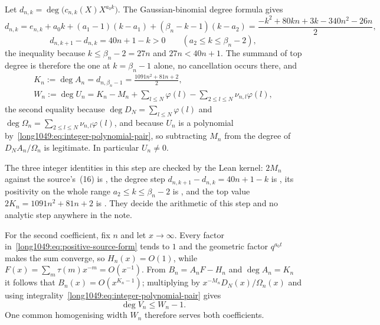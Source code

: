 Let $d_{n,k}=\deg\bigl(c_{n,k}(X)X^{a_0k}\bigr)$.  The Gaussian-binomial degree
formula gives
\[
 d_{n,k}=e_{n,k}+a_0k+(a_1-1)(k-a_1)+(\beta_n-k-1)(k-a_2)
 =\frac{-k^{2}+80kn+3k-340n^{2}-26n}{2},
\]
\[
 d_{n,k+1}-d_{n,k}=40n+1-k>0\qquad(a_2\le k\le\beta_n-2),
\]
the inequality because $k\le\beta_n-2=27n$ and $27n<40n+1$.  The summand of
top degree is therefore the one at $k=\beta_n-1$ alone, no cancellation occurs
there, and
\begin{equation}\label{long1049:eq:exact-degree}
 \begin{gathered}
 K_n:=\deg A_n=d_{n,\beta_n-1}=\frac{1091n^{2}+81n+2}{2},
 \\
 W_n:=\deg U_n=K_n-M_n+\sum_{l\le N}\varphi(l)-\sum_{2\le l\le N}\nu_{n,l}\varphi(l),
\end{gathered}
\end{equation}
the second equality because $\deg D_N=\sum_{l\le N}\varphi(l)$ and
$\deg\Omega_n=\sum_{2\le l\le N}\nu_{n,l}\varphi(l)$, and because
$U_n$ is a polynomial by~\eqref{long1049:eq:integer-polynomial-pair}, so subtracting
$M_n$ from the degree of $D_NA_n/\Omega_n$ is legitimate.  In particular
$U_n\ne0$.

The three integer identities in this step are checked by the Lean kernel:
$2M_n$ against the source's~(16) is
, the degree step $d_{n,k+1}-d_{n,k}=40n+1-k$ is
, its positivity on the whole range $a_2\le k\le\beta_n-2$ is
, and the top value $2K_n=1091n^{2}+81n+2$ is
.  They decide the arithmetic of this step and no analytic step
anywhere in the note.

For the second coefficient, fix $n$ and let $x\to\infty$.  Every factor
in~\eqref{long1049:eq:positive-source-form} tends to $1$ and the geometric factor
$q^{a_0t}$ makes the sum converge, so $H_n(x)=O(1)$, while
$F(x)=\sum_m\tau(m)x^{-m}=O(x^{-1})$.  From $B_n=A_nF-H_n$ and
$\deg A_n=K_n$ it follows that $B_n(x)=O(x^{K_n-1})$; multiplying by
$x^{-M_n}D_N(x)/\Omega_n(x)$ and using
integrality~\eqref{long1049:eq:integer-polynomial-pair} gives
\begin{equation}\label{long1049:eq:V-degree}
 \deg V_n\le W_n-1 .
\end{equation}
One common homogenising width $W_n$ therefore serves both coefficients.

